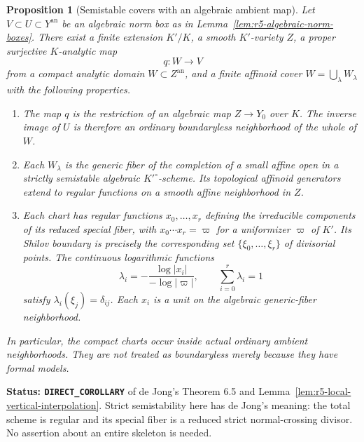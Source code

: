 \documentclass[11pt,a4paper]{article}
\numberwithin{equation}{section}
\newtheorem{proposition}[theorem]{Proposition}
\theoremstyle{definition}
\theoremstyle{remark}
\begin{document}
\begin{proposition}[Semistable covers with an algebraic ambient map]
\label{prop:r5-semistable-overconvergent-cover}
Let $V\subset U\subset Y^{\mathrm{an}}$ be an algebraic norm box
as in Lemma~\ref{lem:r5-algebraic-norm-boxes}. There exist a
finite extension $K'/K$, a smooth $K'$-variety $Z$, a proper
surjective $K$-analytic map
\[
                         q:W\longrightarrow V
\]
from a compact analytic domain $W\subset Z^{\mathrm{an}}$,
and a finite affinoid cover $W=\bigcup_\lambda W_\lambda$
with the following properties.
\begin{enumerate}
\item The map $q$ is the restriction of an algebraic map
$Z\to Y_0$ over $K$. The inverse image of $U$ is therefore
an ordinary boundaryless neighborhood of the whole of $W$.
\item Each $W_\lambda$ is the generic fiber of the completion
of a small affine open in a strictly semistable algebraic
$K'^\circ$-scheme. Its topological affinoid generators extend
to regular functions on a smooth affine neighborhood in $Z$.
\item Each chart has regular functions $x_0,\ldots,x_r$
defining the irreducible components of its reduced special
fiber, with $x_0\cdots x_r=\varpi$ for a uniformizer
$\varpi$ of $K'$. Its Shilov boundary is precisely the
corresponding set $\{\xi_0,\ldots,\xi_r\}$ of divisorial
points. The continuous logarithmic functions
\[
 \lambda_i=-\frac{\log|x_i|}{-\log|\varpi|},\qquad
 \sum_{i=0}^r\lambda_i=1
\]
satisfy $\lambda_i(\xi_j)=\delta_{ij}$. Each $x_i$ is a
unit on the algebraic generic-fiber neighborhood.
\end{enumerate}
In particular, the compact charts occur inside actual ordinary
ambient neighborhoods. They are not treated as boundaryless
merely because they have formal models.
\end{proposition}

\noindent\textbf{Status: \texttt{DIRECT\_COROLLARY}} of de Jong's
Theorem 6.5 \cite{dJ96} and
Lemma~\ref{lem:r5-local-vertical-interpolation}. Strict
semistability here has de Jong's meaning: the total scheme is
regular and its special fiber is a reduced strict normal-crossing
divisor. No assertion about an entire skeleton is needed.
\end{document}
